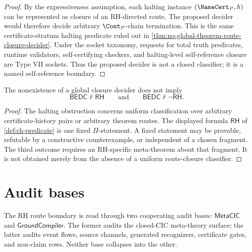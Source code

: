\begin{proof}
By the expressiveness assumption, each halting instance
$(\NameCert_P,h)$ can be represented as closure of an RH-directed route.
The proposed decider would therefore decide arbitrary $\Cont_P$-chain
termination.  This is the same certificate-stratum halting predicate ruled
out in \autoref{thm:no-global-theorem-route-closure-decider}.  Under the
socket taxonomy, requests for total truth predicates, runtime validators,
self-certifying checkers, and halting-level self-reference closure are Type
VII sockets.  Thus the proposed decider is not a closed classifier; it is a
named self-reference boundary.
\end{proof}

\begin{theorem}
\label{thm:rh-fixed-statement-not-independent-by-halting}
The nonexistence of a global closure decider does not imply
$$
\mathsf{BEDC}\not\vdash\mathsf{RH}
\qquad\text{and}\qquad
\mathsf{BEDC}\not\vdash\neg\mathsf{RH}.
$$
\end{theorem}

\begin{proof}
The halting obstruction concerns uniform classification over arbitrary
certificate-history pairs or arbitrary theorem routes.  The displayed
formula $\mathsf{RH}$ of \autoref{def:rh-predicate} is one fixed
$\Pi$-statement.  A fixed statement may be provable, refutable by a
constructive counterexample, or independent of a chosen fragment.  The
third outcome requires an RH-specific meta-theorem about that fragment.
It is not obtained merely from the absence of a uniform route-closure
classifier.
\end{proof}

\section{Audit bases}
\label{sec:rh-route-audit-bases}

\begin{theorem}
\label{thm:rh-metacic-groundcompiler-distinct-audit-bases}
The RH route boundary is read through two cooperating audit bases:
$\mathsf{MetaCIC}$ and $\mathsf{GroundCompiler}$.  The former audits the
closed-CIC meta-theory surface; the latter audits event flows, source
channels, generated recognizers, certificate gates, and non-claim rows.
Neither base collapses into the other.
\end{theorem}

